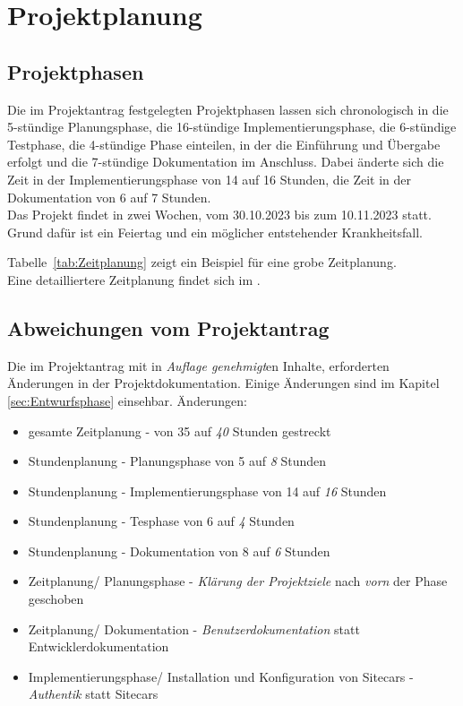 \section{Projektplanung} 
\label{sec:Projektplanung}


\subsection{Projektphasen}
\label{sec:Projektphasen}
Die im Projektantrag festgelegten Projektphasen lassen sich chronologisch in die 5-stündige Planungsphase, 
die 16-stündige Implementierungsphase, die 6-stündige Testphase, die 4-stündige Phase einteilen, in der die 
Einführung und Übergabe erfolgt und die 7-stündige Dokumentation im Anschluss.
Dabei änderte sich die Zeit in der Implementierungsphase von 14 auf 16 Stunden, die Zeit in der 
Dokumentation von 6 auf 7 Stunden.
\\Das Projekt findet in zwei Wochen, vom 30.10.2023 bis zum 10.11.2023 statt. Grund dafür ist ein Feiertag 
und ein möglicher entstehender Krankheitsfall.

Tabelle~\ref{tab:Zeitplanung} zeigt ein Beispiel für eine grobe Zeitplanung.
\\
Eine detailliertere Zeitplanung findet sich im .


\subsection{Abweichungen vom Projektantrag}
\label{sec:AbweichungenProjektantrag}
Die im Projektantrag mit in \textit{Auflage genehmigt}en Inhalte, erforderten Änderungen in der 
Projektdokumentation. Einige Änderungen sind im Kapitel \ref*{sec:Entwurfsphase} 
 einsehbar. Änderungen:
\begin{itemize} [label=--]
	\item gesamte Zeitplanung - von 35 auf \textit{40} Stunden gestreckt
	\item Stundenplanung - Planungsphase von 5 auf \textit{8} Stunden
	\item Stundenplanung - Implementierungsphase von 14 auf \textit{16} Stunden
	\item Stundenplanung - Tesphase von 6 auf \textit{4} Stunden
	\item Stundenplanung - Dokumentation von 8 auf \textit{6} Stunden
	\item Zeitplanung/ Planungsphase - \textit{Klärung der Projektziele} nach \textit{vorn} der Phase geschoben
	\item Zeitplanung/ Dokumentation - \textit{Benutzerdokumentation} statt Entwicklerdokumentation
	\item Implementierungsphase/ Installation und Konfiguration von Sitecars - \textit{Authentik} statt Sitecars
\end{itemize}


